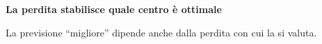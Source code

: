 \documentclass[12pt,aspectratio=1610]{beamer}
\begin{document}
\begin{frame}[plain]\hypertarget{slide9}{}
\begin{lrbox}{\TitleBox}
\begin{minipage}[t]{17.7cm}\raggedright\color{Ink}\fontsize{11.3}{14.8}\selectfont
\color{Navy}\bfseries\fontsize{20.6}{24.5}\selectfont La perdita stabilisce quale centro è ottimale
\end{minipage}\end{lrbox}

\begin{lrbox}{\RecallBox}
\begin{minipage}[t]{14.3cm}\raggedright\color{Ink}\fontsize{11.3}{14.8}\selectfont
\fontsize{10.3}{13.8}\selectfont La previsione “migliore” dipende anche dalla perdita con cui la si valuta.
\end{minipage}\end{lrbox}


\end{frame}
\end{document}
